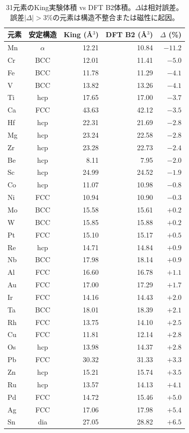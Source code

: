 \documentclass[5p,10pt]{elsarticle}
\begin{document}
\begin{table}[H]
\centering
\caption{31元素のKing実験体積 vs DFT B2体積。$\Delta$は相対誤差。
誤差$|\Delta| > 3\%$の元素は構造不整合または磁性に起因。}
\label{tab:king_dft_all}
\scriptsize
\begin{tabular}{@{}lcrrr@{}}
\toprule
元素 & 安定構造 & King (\AA$^3$) & DFT B2 (\AA$^3$) & $\Delta$ (\%) \\
\midrule
Mn & $\alpha$ & 12.21 & 10.84 & $-11.2$ \\
Cr & BCC & 12.01 & 11.41 & $-5.0$ \\
Fe & BCC & 11.78 & 11.29 & $-4.1$ \\
V  & BCC & 13.82 & 13.26 & $-4.1$ \\
Ti & hcp & 17.65 & 17.00 & $-3.7$ \\
Ca & FCC & 43.63 & 42.12 & $-3.5$ \\
Hf & hcp & 22.31 & 21.69 & $-2.8$ \\
Mg & hcp & 23.24 & 22.58 & $-2.8$ \\
Zr & hcp & 23.28 & 22.73 & $-2.4$ \\
Be & hcp &  8.11 &  7.95 & $-2.0$ \\
Sc & hcp & 24.99 & 24.52 & $-1.9$ \\
Co & hcp & 11.07 & 10.98 & $-0.8$ \\
Ni & FCC & 10.94 & 10.90 & $-0.3$ \\
Mo & BCC & 15.58 & 15.61 & $+0.2$ \\
W  & BCC & 15.85 & 15.88 & $+0.2$ \\
Pt & FCC & 15.10 & 15.17 & $+0.5$ \\
Re & hcp & 14.71 & 14.84 & $+0.9$ \\
Nb & BCC & 17.98 & 18.14 & $+0.9$ \\
Al & FCC & 16.60 & 16.78 & $+1.1$ \\
Au & FCC & 17.00 & 17.29 & $+1.7$ \\
Ir & FCC & 14.16 & 14.43 & $+2.0$ \\
Ta & BCC & 18.01 & 18.39 & $+2.1$ \\
Rh & FCC & 13.75 & 14.10 & $+2.5$ \\
Cu & FCC & 11.81 & 12.14 & $+2.8$ \\
Os & hcp & 13.98 & 14.37 & $+2.8$ \\
Pb & FCC & 30.32 & 31.33 & $+3.3$ \\
Zn & hcp & 15.21 & 15.74 & $+3.5$ \\
Ru & hcp & 13.57 & 14.13 & $+4.1$ \\
Pd & FCC & 14.72 & 15.46 & $+5.0$ \\
Ag & FCC & 17.06 & 17.98 & $+5.4$ \\
Sn & dia & 27.05 & 28.82 & $+6.5$ \\
\bottomrule
\end{tabular}
\end{table}
\end{document}
